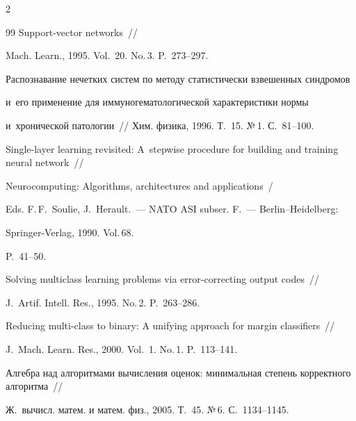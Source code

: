 \begin{multicols}{2}
{{\begin{thebibliography}{99}
{Support-vector networks}~//


    Mach. Learn.,  1995. Vol.~20. No.\,3. P.~273--297.






    Распознавание нечетких сис\-тем по методу статистически взвешенных синдромов 


    и~его применение для иммуногематологической характеристики нормы 


    и~хронической патологии~// Хим. физика, 1996.  Т.~15. №\,1.  С.~81--100.












{ Single-layer learning revisited: A~stepwise procedure for building and training neural network}~//


    Neurocomputing: Algorithms, architectures and applications~/


    Eds. F.\,F.~Soulie, J.~Herault.~--- NATO ASI subser. F.~---  Berlin--Heidelberg:


    Springer-Verlag, 1990. Vol.\,68. 


    P.~41--50.






{Solving multiclass learning problems via error-correcting output codes}~//


    J.~Artif. Intell. Res., 1995. No.\,2. P.~263--286.






{Reducing multi-class to binary: A unifying approach for margin classifiers}~//


    J.~Mach. Learn. Res., 2000. Vol.~1. No.\,1. P.~113--141.






    {Алгебра над алгоритмами вычисления оценок: минимальная степень корректного алгоритма}~//


    Ж.~вычисл. матем. и матем. физ.,  2005. Т.~45. №\,6. С.~1134--1145.



\end{thebibliography}}}
\end{multicols}
